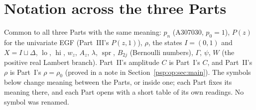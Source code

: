 \documentclass[11pt,letterpaper]{article}
\numberwithin{equation}{section}
\theoremstyle{remark}\newtheorem{remark}[theorem]{Remark}
\newcommand{\lo}{\operatorname{lo}}
\newcommand{\hi}{\operatorname{hi}}
\newcommand{\spr}{\operatorname{spr}}
\begin{document}
\section*{Notation across the three Parts}\label{psp:sec:notation}
Common to all three Parts with the same meaning: $p_n$ (A307030, $p_0=1$), $P(z)$ for the univariate EGF (Part~III's $P(z,1)$), $\rho$, the states $I=(0,1)$ and $X=I\sqcup\Delta$, $\lo$, $\hi$, $w_z$, $A_z$, $\lambda$, $\spr$, $B_{2j}$ (Bernoulli numbers), $\Gamma$, $\psi$, $W$ (the positive real Lambert branch). Part~II's amplitude $C$ is Part~I's $C$, and Part~II's $\rho$ is Part~I's $\rho=\rho_0$ (proved in a note in Section~\ref{psp:op:sec:main}). The symbols below change meaning between the Parts, or inside one; each Part fixes its meaning there, and each Part opens with a short table of its own readings. No symbol was renamed.
\begingroup\small
\renewcommand{\theHtable}{notation.\arabic{table}}
\end{document}
